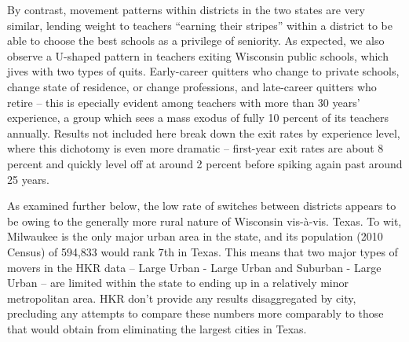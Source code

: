 By contrast, movement patterns within districts in the two states are
very similar, lending weight to teachers ``earning their stripes''
within a district to be able to choose the best schools as a privilege
of seniority. As expected, we also observe a U-shaped pattern in
teachers exiting Wisconsin public schools, which jives with two types of
quits. Early-career quitters who change to private schools, change state
of residence, or change professions, and late-career quitters who retire
-- this is epecially evident among teachers with more than 30 years'
experience, a group which sees a mass exodus of fully 10 percent of its
teachers annually. Results not included here break down the exit rates
by experience level, where this dichotomy is even more dramatic --
first-year exit rates are about 8 percent and quickly level off at
around 2 percent before spiking again past around 25 years.

As examined further below, the low rate of switches between districts
appears to be owing to the generally more rural nature of Wisconsin
vis-à-vis. Texas. To wit, Milwaukee is the only major urban area in the
state, and its population (2010 Census) of 594,833 would rank 7th in
Texas. This means that two major types of movers in the HKR data --
Large Urban - Large Urban and Suburban - Large Urban -- are limited
within the state to ending up in a relatively minor metropolitan area.
HKR don't provide any results disaggregated by city, precluding any
attempts to compare these numbers more comparably to those that would
obtain from eliminating the largest cities in Texas.

